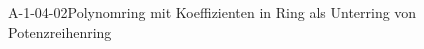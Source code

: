 
\begin{DEF}{A-1-04-02}{Polynomring mit Koeffizienten in Ring als Unterring von Potenzreihenring}
\end{DEF}
